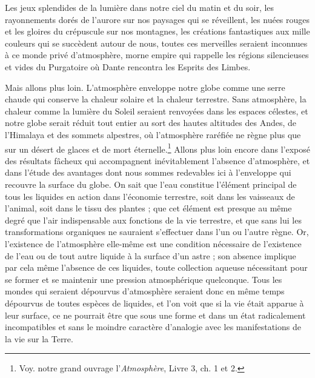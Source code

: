 \documentclass[a4paper, 11pt, oneside]{article}
\begin{document}
Les jeux splendides de la lumière dans notre ciel du matin et du soir, les rayonnements dorés de l'aurore sur nos paysages qui se réveillent, les nuées rouges et les gloires du crépuscule sur nos montagnes, les créations fantastiques aux mille couleurs qui se succèdent autour de nous, toutes ces merveilles seraient inconnues à ce monde privé d'atmosphère, morne empire qui rappelle les régions silencieuses et vides du Purgatoire où Dante rencontra les Esprits des Limbes.

Mais allons plus loin. L'atmosphère enveloppe notre globe comme une serre chaude qui conserve la chaleur solaire et la chaleur terrestre. Sans atmosphère, la chaleur comme la lumière du Soleil seraient renvoyées dans les espaces célestes, et notre globe serait réduit tout entier au sort des hautes altitudes des Andes, de l'Himalaya et des sommets alpestres, où l'atmosphère raréfiée ne règne plus que sur un désert de glaces et de mort éternelle.\footnote{Voy. notre grand ouvrage l'\emph{Atmosphère}, Livre 3, ch. 1 et 2.} Allons plus loin encore dans l'exposé des résultats fâcheux qui accompagnent inévitablement l'absence d'atmosphère, et dans l'étude des avantages dont nous sommes redevables ici à l'enveloppe qui recouvre la surface du globe. On sait que l'eau constitue l'élément principal de tous les liquides en action dans l'économie terrestre, soit dans les vaisseaux de l'animal, soit dans le tissu des plantes ; que cet élément est presque au même degré que l'air indispensable aux fonctions de la vie terrestre, et que sans lui les transformations organiques ne sauraient s'effectuer dans l'un ou l'autre règne. Or, l'existence de l'atmosphère elle-même est une condition nécessaire de l'existence de l'eau ou de tout autre liquide à la surface d'un astre ; son absence implique par cela même l'absence de ces liquides, toute collection aqueuse nécessitant pour se former et se maintenir une pression atmosphérique quelconque. Tous les mondes qui seraient dépourvus d'atmosphère seraient donc en même temps dépourvus de toutes espèces de liquides, et l'on voit que si la vie était apparue à leur surface, ce ne pourrait être que sous une forme et dans un état radicalement incompatibles et sans le moindre caractère d'analogie avec les manifestations de la vie sur la Terre.
\end{document}
